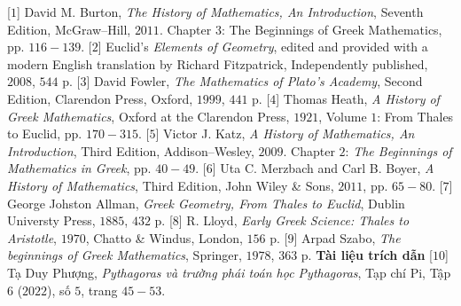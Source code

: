 \begin{multicols}{2}
	\vskip 0.1cm
	[$1$] David M. Burton, \textit{The History of Mathematics, An Introduction}, Seventh Edition, McGraw--Hill, $2011$. Chapter $3$: The Beginnings of Greek Mathematics, pp. $116-139$.
	\vskip 0.1cm
	[$2$] Euclid’s \textit{Elements of Geometry}, edited and provided with a modern English translation by Richard Fitzpatrick, Independently published, $2008$, $544$ p.
	\vskip 0.1cm
	[$3$] David Fowler, \textit{The Mathematics of Plato’s Academy}, Second Edition, Clarendon Press, Oxford, $1999$, $441$ p.
	\vskip 0.1cm   
	[$4$] Thomas Heath, \textit{A History of Greek Mathematics}, Oxford at the Clarendon Press, $1921$, Volume $1$: From Thales to Euclid, pp. $170-315$.
	\vskip 0.1cm   
	[$5$] Victor J. Katz, \textit{A History of Mathematics, An Introduction}, Third Edition, Addison--Wesley, $2009$. Chapter $2$: \textit{The Beginnings of Mathematics in Greek}, pp. $40-49$.
	\vskip 0.1cm
	[$6$] Uta C. Merzbach and Carl B. Boyer, \textit{A
	History of Mathematics}, Third Edition, John Wiley \& Sons, $2011$, pp. $65-80$.
	\vskip 0.1cm
	[$7$] George Johston Allman, \textit{Greek Geometry, From Thales to Euclid}, Dublin Universty Press, $1885$, $432$ p.
	\vskip 0.1cm  
	[$8$] R. Lloyd, \textit{Early Greek Science: Thales to Aristotle}, $1970$, Chatto \& Windus, London, $156$ p.
	\vskip 0.1cm 
	[$9$] Arpad Szabo, \textit{The beginnings of Greek Mathematics}, Springer, $1978$, $363$ p.
	\vskip 0.1cm
	\textbf{\color{lichsutoanhoc}Tài liệu trích dẫn}
	\vskip 0.1cm
	[$10$] Tạ Duy Phượng, \textit{Pythagoras và trường phái toán học Pythagoras}, Tạp chí Pi, Tập $6$ ($2022$), số $5$, trang $45-53$.
\end{multicols}